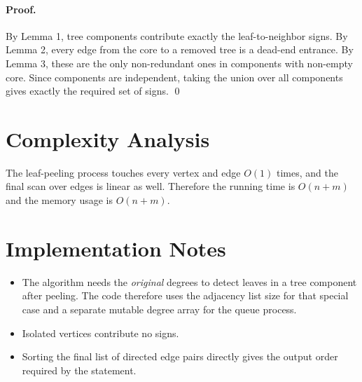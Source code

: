 \documentclass[11pt]{article}
\begin{document}
\paragraph{Proof.}
By Lemma 1, tree components contribute exactly the leaf-to-neighbor signs. By Lemma 2, every edge from the core to a removed tree is a dead-end entrance. By Lemma 3, these are the only non-redundant ones in components with non-empty core. Since components are independent, taking the union over all components gives exactly the required set of signs. \qed

\section*{Complexity Analysis}

The leaf-peeling process touches every vertex and edge $O(1)$ times, and the final scan over edges is linear as well. Therefore the running time is $O(n + m)$ and the memory usage is $O(n + m)$.

\section*{Implementation Notes}

\begin{itemize}[leftmargin=*]
    \item The algorithm needs the \emph{original} degrees to detect leaves in a tree component after peeling. The code therefore uses the adjacency list size for that special case and a separate mutable degree array for the queue process.
    \item Isolated vertices contribute no signs.
    \item Sorting the final list of directed edge pairs directly gives the output order required by the statement.
\end{itemize}
\end{document}
